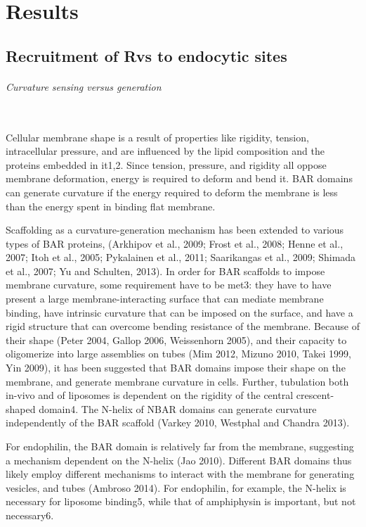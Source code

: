 \chapter{Results}    \label{results}
\section{Recruitment of Rvs to endocytic sites}

	\subparagraph{Curvature sensing versus generation }
	\mbox{}\\
Cellular membrane shape is a result of properties like rigidity, tension, intracellular pressure, and are influenced by the lipid composition and the proteins embedded in it1,2. Since tension, pressure, and rigidity all oppose membrane deformation, energy is required to deform and bend it. BAR domains can generate curvature if the energy required to deform the membrane is less than the energy spent in binding flat membrane.

\vspace{5mm}
			
Scaffolding as a curvature-generation mechanism has been extended to various types of BAR proteins, (Arkhipov et al., 2009; Frost et al., 2008; Henne et al., 2007; Itoh et al., 2005; Pykalainen et al., 2011; Saarikangas et al., 2009; Shimada et al., 2007; Yu and Schulten, 2013). In order for BAR scaffolds to impose membrane curvature, some requirement have to be met3: they have to have present a large membrane-interacting surface that can mediate membrane binding, have intrinsic curvature that can be imposed on the surface, and have a rigid structure that can overcome bending resistance of the membrane. Because of their shape (Peter 2004, Gallop 2006, Weissenhorn 2005), and their capacity to oligomerize into large assemblies on tubes (Mim 2012, Mizuno 2010, Takei 1999, Yin 2009), it has been suggested that BAR domains impose their shape on the membrane, and generate membrane curvature in cells. Further, tubulation both in-vivo and of liposomes is dependent on the rigidity of the central crescent-shaped domain4. The N-helix of NBAR domains can generate curvature independently of the BAR scaffold (Varkey 2010, Westphal and Chandra 2013).

\vspace{5mm}
For endophilin, the BAR domain is relatively far from the membrane, suggesting a mechanism dependent on the N-helix (Jao 2010). Different BAR domains thus likely employ different mechanisms to interact with the membrane for generating vesicles, and tubes (Ambroso 2014). For endophilin, for example, the N-helix is necessary for liposome binding5, while that of amphiphysin is important, but not necessary6. 

